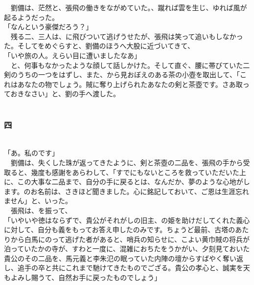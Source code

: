 \documentclass[
  paper=a5,
  fontsize=10pt,
  jafontsize=9.5pt,
  tate,                  %
  open_bracket_pos=nibu, %
]{jlreq}
\begin{document}
　劉備は、茫然と、張飛の働きをながめていた。、蹴れば雲を生じ、ゆれば風が起るようだった。\\


「なんという豪傑だろう？」\\


　残る二、三人は、に飛びついて逃げうせたが、張飛は笑って追いもしなかった。そしてをめぐらすと、劉備のほうへ大股に近づいてきて、\\


「いや旅の人。えらい目に遭いましたなあ」\\


　と、何事もなかったような顔して話しかけた。そして直ぐ、腰に帯びていた二剣のうちの一つをはずし、また、から見おぼえのある茶の小壺を取出して、「これはあなたの物でしょう。賊に奪り上げられたあなたの剣と茶壺です。さあ取っておきなさい」と、劉の手へ渡した。\\

\\

\subsubsection{四}

\\


「あ。私のです」\\


　劉備は、失くした珠が返ってきたように、剣と茶壺の二品を、張飛の手から受取ると、幾度も感謝をあらわして、「すでにもないところを救っていただいた上に、この大事な二品まで、自分の手に戻るとは、なんだか、夢のような心地がします。のお名前は、さきほど聞きました。心に銘記しておいて、ご恩は生涯忘れません」と、いった。\\


　張飛は、を振って、\\


「いやいや徳はならずで、貴公がそれがしの旧主、の姫を助けだしてくれた義心に対して、自分も義をもってお答え申したのみです。ちょうど最前、古塔のあたりから白馬にのって逃げた者があると、哨兵の知らせに、こよい黄巾賊の将兵が泊っていたかの寺が、すわと一度に、混雑におちたをうかがい、夕刻見ておいた貴公のその二品を、馬元義と李朱氾の眠っていた内陣の壇からすばやく奪い返し、追手の卒と共にこれまで馳けてきたものでござる。貴公の孝心と、誠実を天もよみし賜うて、自然お手に戻ったものでしょう」\\
\end{document}
